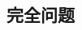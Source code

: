 \documentclass[twocolumn]{article}
\renewcommand\figurename{图}
\theoremstyle{nonumberplain}%
\begin{document}
\begin{CJK}{UTF8}{gbsn}
\section{完全问题}




\end{CJK}
\end{document}
